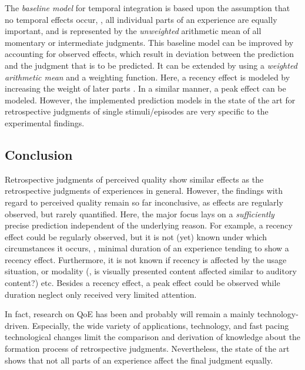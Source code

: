 The \emph{baseline model} for temporal integration is based upon the assumption that no temporal effects occur, \ie, all individual parts of an experience are equally important, and is represented by the \emph{unweighted} arithmetic mean of all momentary or intermediate judgments.
This baseline model can be improved by accounting for observed effects, which result in deviation between the prediction and the judgment that is to be predicted.
It can be extended by using a \emph{weighted arithmetic mean} and a weighting function.
Here, a recency effect is modeled by increasing the weight of later parts \citep[][]{rosenbluth_testing_1998, weiss_modeling_2009, hamberg_time-varying_1999}.
In a similar manner, a peak effect can be modeled.
However, the implemented prediction models in the state of the art for retrospective judgments of single stimuli/episodes are very specific to the experimental findings.

\subsection{Conclusion}
Retrospective judgments of perceived quality show similar effects as the retrospective judgments of experiences in general.
However, the findings with regard to perceived quality remain so far inconclusive, as effects are regularly observed, but rarely quantified.
Here, the major focus lays on a \emph{sufficiently} precise prediction independent of the underlying reason.
For example, a recency effect could be regularly observed, but it is not (yet) known under which circumstances it occurs, \eg, minimal duration of an experience tending to show a recency effect.
Furthermore, it is not known if recency is affected by the usage situation, or modality (\eg, is visually presented content affected similar to auditory content?) etc.
Besides a recency effect, a peak effect could be observed while duration neglect only received very limited attention.

In fact, research on \ac{QoE} has been and probably will remain a mainly technology-driven.
Especially, the wide variety of applications, technology, and fast pacing technological changes limit the comparison and derivation of knowledge about the formation process of retrospective judgments.
Nevertheless, the state of the art shows that not all parts of an experience affect the final judgment equally.
